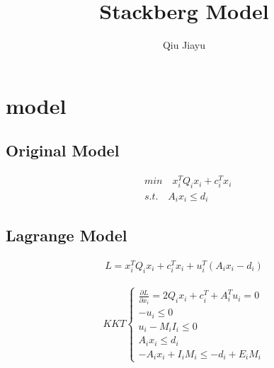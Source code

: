 \documentclass[11pt]{article} %
\title{Stackberg Model}
\author{Qiu Jiayu}
\begin{document}
\maketitle

\section{model}
\subsection{Original Model}

\begin{align}  
    &min \quad  x_i^T Q_i x_i + c_i^T x_i \nonumber\\
    &s.t. \quad A_ix_i \leq d_i
\end{align}






\subsection{Lagrange Model}
\begin{align}  
    L =  x_i^T Q_i x_i + c_i^T x_i + u_i^T( A_ix_i - d_i)
\end{align}


\begin{align} 
    KKT\begin{cases} 
            \frac{\partial L}{\partial x_i} = 2 Q_i x_i + c_i^T + A_i^T u_i = 0 \\
            -u_i \leq 0 \\
            u_i - M_iI_i \leq 0\\
            A_ix_i  \leq d_i \\
            - A_ix_i + I_i M_i \leq -d_i + E_i M_i
    \end{cases}
\end{align} 
\end{document}
